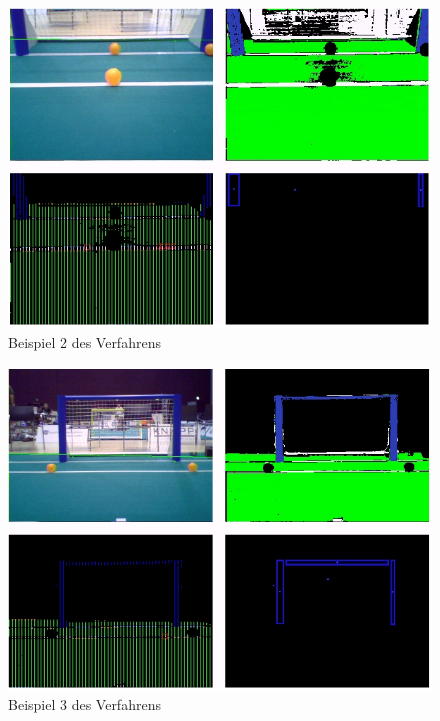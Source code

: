 \documentclass[a4paper,12pt]{article}
\begin{document}
\begin{figure}[H]
\includegraphics[scale=0.8]{example-detection2.png}
\caption{Beispiel 2 des Verfahrens}
\label{fig:example2}
\end{figure}

\begin{figure}[H]
\includegraphics[scale=0.8]{example-detection3.png}
\caption{Beispiel 3 des Verfahrens}
\label{fig:example3}
\end{figure}
\end{document}
